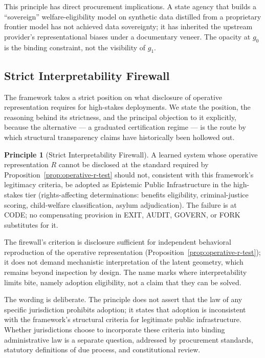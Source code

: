 \documentclass{article}
\theoremstyle{definition}
\newtheorem{principle}{Principle}[section]
\begin{document}
This principle has direct procurement implications. A state agency that builds a ``sovereign'' welfare-eligibility model on synthetic data distilled from a proprietary frontier model has not achieved data sovereignty; it has inherited the upstream provider's representational biases under a documentary veneer. The opacity at $g_0$ is the binding constraint, not the visibility of $g_1$.

\subsection{Strict Interpretability Firewall}
\label{subsec:firewall}

The framework takes a strict position on what disclosure of operative representation requires for high-stakes deployments. We state the position, the reasoning behind its strictness, and the principal objection to it explicitly, because the alternative --- a graduated certification regime --- is the route by which structural transparency claims have historically been hollowed out.

\begin{principle}[Strict Interpretability Firewall]
\label{prin:firewall}
A learned system whose operative representation $R$ cannot be disclosed at the standard required by Proposition~\ref{prop:operative-r-test} should not, consistent with this framework's legitimacy criteria, be adopted as Epistemic Public Infrastructure in the high-stakes tier (rights-affecting determinations: benefits eligibility, criminal-justice scoring, child-welfare classification, asylum adjudication). The failure is at CODE; no compensating provision in EXIT, AUDIT, GOVERN, or FORK substitutes for it.
\end{principle}

The firewall's criterion is disclosure sufficient for independent behavioral reproduction of the operative representation (Proposition~\ref{prop:operative-r-test}); it does not demand mechanistic interpretation of the latent geometry, which remains beyond inspection by design. The name marks where interpretability limits bite, namely adoption eligibility, not a claim that they can be solved.

The wording is deliberate. The principle does not assert that the law of any specific jurisdiction prohibits adoption; it states that adoption is inconsistent with the framework's structural criteria for legitimate public infrastructure. Whether jurisdictions choose to incorporate these criteria into binding administrative law is a separate question, addressed by procurement standards, statutory definitions of due process, and constitutional review.
\end{document}
